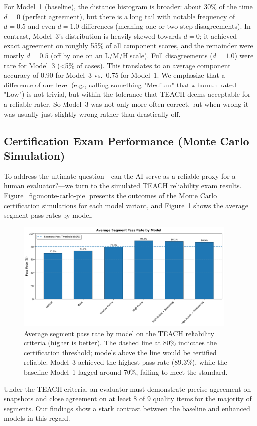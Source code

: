 \documentclass[12pt]{article}
\begin{document}
For Model~1 (baseline), the distance histogram is broader: about 30\% of the time \(d=0\) (perfect agreement), but there is a long tail with notable frequency of \(d=0.5\) and even \(d=1.0\) differences (meaning one or two-step disagreements). In contrast, Model~3's distribution is heavily skewed towards \(d=0\); it achieved exact agreement on roughly 55\% of all component scores, and the remainder were mostly \(d=0.5\) (off by one on an L/M/H scale). Full disagreements (\(d=1.0\)) were rare for Model~3 (<5\% of cases). This translates to an average component accuracy of 0.90 for Model~3 vs.\ 0.75 for Model~1. We emphasize that a difference of one level (e.g., calling something "Medium" that a human rated "Low") is not trivial, but within the tolerance that TEACH deems acceptable for a reliable rater. So Model~3 was not only more often correct, but when wrong it was usually just slightly wrong rather than drastically off.

\subsection{Certification Exam Performance (Monte Carlo Simulation)}
To address the ultimate question—can the AI serve as a reliable proxy for a human evaluator?—we turn to the simulated TEACH reliability exam results. Figure~\ref{fig:monte-carlo-pie} presents the outcomes of the Monte Carlo certification simulations for each model variant, and Figure~\ref{fig:segment-pass-bar} shows the average segment pass rates by model.

\begin{figure}[t]\centering
\includegraphics[width=0.95\textwidth]{segment_pass_dashboard.png}
\caption{Average segment pass rate by model on the TEACH reliability criteria (higher is better). The dashed line at 80\% indicates the certification threshold; models above the line would be certified reliable. Model~3 achieved the highest pass rate (89.3\%), while the baseline Model~1 lagged around 70\%, failing to meet the standard.}
\label{fig:segment-pass-bar}
\end{figure} Under the TEACH criteria, an evaluator must demonstrate precise agreement on snapshots and close agreement on at least 8 of 9 quality items for the majority of segments. Our findings show a stark contrast between the baseline and enhanced models in this regard.
\end{document}

